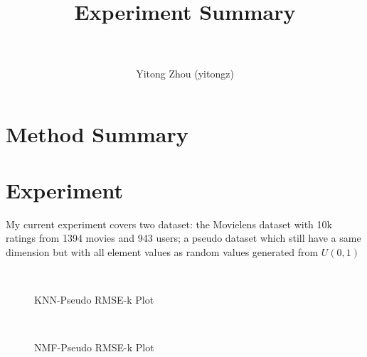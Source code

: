 \documentclass[paper=a4, fontsize=11pt]{scrartcl}
\title{
        \usefont{OT1}{bch}{b}{n}
        \normalfont \normalsize \textsc{} \\ [25pt]
        \horrule{0.5pt} \\[0.4cm]
        \huge Experiment Summary \\
        \horrule{2pt} \\[0.5cm]
}
\author{
        \normalfont                                 \normalsize
        Yitong Zhou (yitongz)\\[-3pt]       \normalsize
}
\numberwithin{equation}{section}        %
\numberwithin{figure}{section}          %
\numberwithin{table}{section}               %
\begin{document}
\maketitle

\section{Method Summary}

\section{Experiment}
My current experiment covers two dataset: the Movielens dataset with 10k ratings from 1394 movies and 943 users; a pseudo dataset which still have a same dimension but with all element values as random values generated from $U(0, 1)$ 
\begin{figure}
\centering
\mbox{
}
\caption{KNN-Pseudo RMSE-k Plot} \label{fig3}
\end{figure}
\begin{figure}
\centering
\mbox{
}
\caption{NMF-Pseudo RMSE-k Plot} \label{fig4}
\end{figure}
\end{document}
